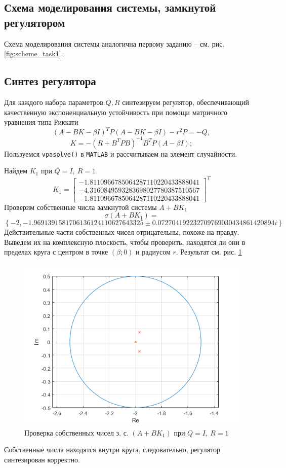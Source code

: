 \documentclass[a4paper, 12pt]{article}
\begin{document}
    \subsection{Схема моделирования системы, замкнутой регулятором}
    Схема моделирования системы аналогична первому заданию -- см. рис. \ref{fig:scheme_task1}.


    \subsection{Синтез регулятора}
    Для каждого набора параметров $Q,R$ синтезируем регулятор, обеспечивающий качественную экспоненциальную
    устойчивость при помощи матричного уравнения типа Риккати
    $$
    \left( A-BK-\beta I \right)^TP\left( A-BK-\beta I \right)-r^2P=-Q,
    $$
    $$K=-\left( R+B^TPB \right)^{-1}B^TP\left( A-\beta I \right);
    $$
    Пользуемся \texttt{vpasolve()} в \texttt{MATLAB} и рассчитываем на элемент случайности.
    

    Найдем $K_1$ при $Q=I,\ R=1$
    $$
    K_1=\begin{bmatrix}
        -1.8110966785064287110220433888041\\-4.3160849593283698027780387510567\\-1.8110966785064287110220433888041
    \end{bmatrix}^T
    $$
    Проверим собственные числа замкнутой системы $A+BK_1$
    $$
    \sigma\left( A+BK_1 \right)=$$
    $$
    \left\{ -2,-1.9691391581706136124110627643325 \pm 0.072704192232709769030434861420894i \right\}
    $$
    Действительные части собственных чисел отрицательны, похоже на правду. Выведем их на комплексную плоскость,
    чтобы проверить, находятся ли они в пределах круга с центром в точке $\left( \beta;0 \right)$ и радиусом $r$.
    Результат см. рис. \ref{3task_eig_QI_R1}
    \begin{figure}[H]
        \centering
        \includegraphics[scale=0.75]{3task_eig_QI_R1.png}
        \captionsetup{skip=0pt}
        \caption{Проверка собственных чисел з. с. $\left(A+BK_1\right)$ при $Q=I,\ R=1$}
        \label{3task_eig_QI_R1}
    \end{figure}
    \noindent Собственные числа находятся внутри круга, следовательно, регулятор синтезирован корректно.
\end{document}

